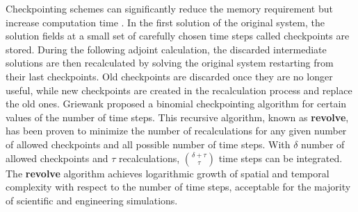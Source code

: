 Checkpointing schemes can significantly reduce the memory requirement but
increase computation time \cite[]{charpentier2001}.  In the first solution of
the original system, the solution fields at a small set of carefully chosen
time steps
called checkpoints are stored.  During the following adjoint calculation, the
discarded intermediate solutions are then recalculated by solving the original
system restarting from their last checkpoints.  Old checkpoints are discarded
once they are no longer useful, while new checkpoints are created in the
recalculation process and replace the old ones.  Griewank \cite[]{griewank92}
proposed a binomial checkpointing algorithm for certain values of the number
of time steps.  This recursive algorithm, known as {\bf revolve}, has been
proven \cite[]{griewank00} to minimize the number of recalculations for any given
number of allowed checkpoints and all possible number of time
steps.  With $\delta$ number of allowed checkpoints and $\tau$
recalculations, $\binom{\delta + \tau}{\tau}$ time steps can
be integrated.  The {\bf revolve} algorithm achieves logarithmic growth of
spatial and temporal complexity with respect to the number of time steps,
acceptable for the majority of scientific and engineering simulations.

